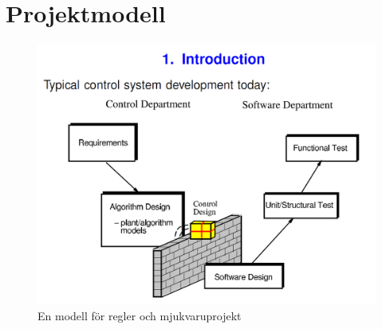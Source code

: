 \documentclass[a4paper]{article}
\begin{document}
\section{Projektmodell}

			\begin{figure}[H]
				\centering
				\includegraphics[width=\textwidth]{projektmodell}
				\caption{En modell för regler och mjukvaruprojekt}
				\label{image_time_proboss}
			\end{figure}
\end{document}
